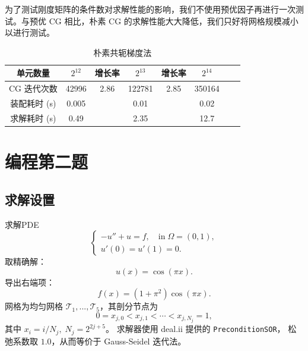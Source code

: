 \documentclass[lang=cn,11pt,a4paper]{elegantpaper}
\begin{document}
为了测试刚度矩阵的条件数对求解性能的影响，我们不使用预优因子再进行一次测试。与预优 CG 相比，朴素 CG 的求解性能大大降低，我们只好将网格规模减小以进行测试。

\begin{table}[H]
    \centering
    \begin{tabular}{|c|c|c|c|c|c|c|c|}
    \hline
    单元数量                    & $2^{12}$ & 增长率 & $2^{13}$ & 增长率 & $2^{14}$ \\ \hline
    CG 迭代次数            & 42996 & 2.86 & 122781 & 2.85 & 350164\\    
\hline
    装配耗时 (s)           & 0.005          &      & 0.01           &      & 0.02     \\ \hline
    求解耗时 (s)           & 0.49          &      & 2.35           &      & 12.7     \\ \hline
    \end{tabular}
    \caption{\small 朴素共轭梯度法}
\end{table}

\section{编程第二题}

\subsection{求解设置}

求解PDE
\begin{equation}
    \left\{
        \begin{array}{l}
            -u'' + u = f,\quad \text{in}\;\Omega=(0,1),\\
            u'(0) = u'(1) = 0.
        \end{array}
    \right.
\end{equation}
取精确解：
\begin{equation}
    u(x)=\cos(\pi x).
\end{equation}
导出右端项：
\begin{equation}
    f(x)=(1+\pi^2)\cos(\pi x).
\end{equation}
网格为均匀网格 $\mathcal{T}_1,...,\mathcal{T}_5$，其剖分节点为
\begin{equation}
    0=x_{j,0}<x_{j,1}<\cdots<x_{j,N_j}=1,
\end{equation}
其中 $x_i=i/N_j,\;N_j=2^{2j+5}$。
求解器使用 deal.ii 提供的 \verb|PreconditionSOR|，
松弛系数取 $1.0$，从而等价于 Gauss-Seidel 迭代法。
\end{document}
